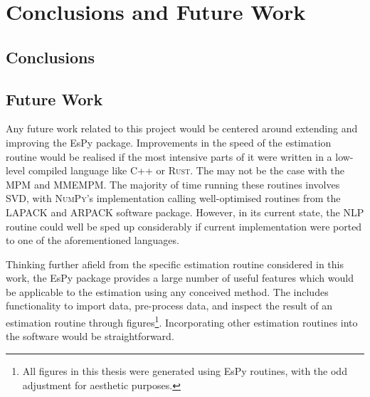 \chapter{Conclusions and Future Work}
\label{chap:conclusions}

\section{Conclusions}

\section{Future Work}
\label{sec:future-work}
Any future work related to this project would be centered around extending and
improving the \ac{EsPy} package. Improvements in the speed of the estimation
routine would be realised if the most intensive parts of it were written in a
low-level compiled language like C++ or \textsc{Rust}. The may not be the case
with the \ac{MPM} and \ac{MMEMPM}.  The majority of time running these routines
involves \ac{SVD}, with \textsc{NumPy}'s implementation calling well-optimised
routines from the \textsc{LAPACK} and \textsc{ARPACK} software package. However,
in its current state, the \ac{NLP} routine could well be sped up considerably
if current \Python implementation were ported to one of the aforementioned
languages.

Thinking further afield from the specific estimation routine considered in this
work, the \ac{EsPy} package provides a large number of useful features which
would be applicable to the estimation using any conceived method. The includes
functionality to import data, pre-process data, and inspect the result of an
estimation routine through figures\footnote{
    All figures in this thesis were generated using \ac{EsPy} routines, with
    the odd adjustment for aesthetic purposes.
}. Incorporating other estimation routines into the software would be
straightforward.

